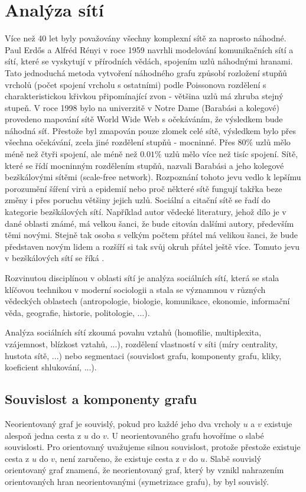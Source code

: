 \documentclass{bakalarka}
\begin{document}


\section{Analýza sítí}
Více než 40 let byly považovány všechny komplexní sítě za naprosto náhodné.
Paul Erdős a Alfréd Rényi v roce 1959 navrhli modelování komunikačních sítí a
sítí, které se vyskytují v přírodních vědách, spojením uzlů náhodnými hranami.
Tato jednoduchá metoda vytvoření náhodného grafu způsobí rozložení stupňů
vrcholů (počet spojení vrcholu s ostatními) podle Poissonova rozdělení s
charakteristickou křivkou připomínající zvon - většina uzlů má zhruba stejný
stupeň. 
V roce 1998 bylo na univerzitě v Notre Dame (Barabási a kolegové) provedeno
mapování sítě World Wide Web s očekáváním, že výsledkem bude náhodná síť.
Přestože byl zmapován pouze zlomek celé sítě, výsledkem bylo přes všechna
očekávání, zcela jiné rozdělení stupňů - mocninné. Přes $80\%$ uzlů mělo méně
než čtyři spojení, ale méně než $0.01\%$ uzlů mělo více než tisíc spojení.
Sítě, které se řídí mocninným rozdělením stupňů, nazvali Barabási a jeho kolegové
bezškálovými sítěmi (scale-free network). Rozpoznání tohoto jevu vedlo k
lepšímu porozumění šíření virů a epidemií nebo proč některé sítě fungují takřka
beze změny i přes poruchu většiny jejich uzlů.  Sociální a citační sítě se řadí
do kategorie bezškálových sítí. Například autor vědecké literatury, jehož dílo
je v dané oblasti známé, má velkou šanci, že bude citován dalšími autory,
především těmi novými. Stejně tak osoba s velkým počtem přátel má velikou
šanci, že bude představen novým lidem a rozšíří si tak svůj okruh přátel ještě
více. Tomuto jevu v bezškálových sítí se říká .

Rozvinutou disciplínou v oblasti sítí je analýza sociálních sítí, která se
stala klíčovou technikou v moderní sociologii a stala se významnou v různých
vědeckých oblastech (antropologie, biologie, komunikace, ekonomie, informační
věda, geografie, historie, politologie, ...).

Analýza sociálních sítí zkoumá povahu vztahů (homofilie, multiplexita,
vzájemnost, blízkost vztahů, ...), rozdělení vlastností v síti (míry
centrality, hustota sítě, ...) nebo segmentaci (souvislost grafu, komponenty
grafu, kliky, koeficient shlukování, ...).

\subsection{Souvislost a komponenty grafu}
Neorientovaný graf je souvislý, pokud pro každé jeho dva vrcholy $u$ a $v$
existuje alespoň jedna cesta z $u$ do $v$. U neorientovaného grafu hovoříme o
slabé souvislosti. Pro orientovaný uvažujeme silnou souvislost, protože
přestože existuje cesta z $u$ do $v$, není zaručeno, že existuje cesta z $v$ do
$u$.  Slabě souvislý orientovaný graf znamená, že neorientovaný graf, který by
vznikl nahrazením orientovaných hran neorientovanými (symetrizace grafu), by
byl souvislý.
\end{document}
